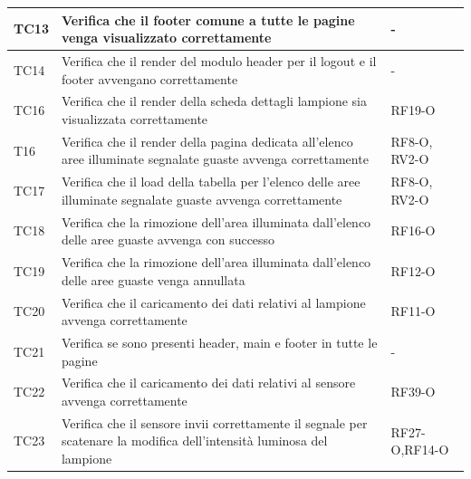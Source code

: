 \documentclass[a4paper, 12pt]{article}
\begin{document}
\begin{center}
	\begin{tabularx}{\textwidth}{|X|X|X|}
	\hline
		\hline
		TC13 & Verifica che il footer comune a tutte le pagine venga visualizzato correttamente & - \\
		\hline
		TC14 & Verifica che il render del modulo header per il logout e il footer avvengano correttamente & - \\
		\hline
		TC16 & Verifica che il render della scheda dettagli lampione sia visualizzata correttamente & RF19-O \\
		\hline
		T16 & Verifica che il render della pagina dedicata all'elenco aree illuminate segnalate guaste avvenga correttamente & RF8-O, RV2-O \\
		\hline
		TC17 & Verifica che il load della tabella per l'elenco delle aree illuminate segnalate guaste avvenga correttamente & RF8-O, RV2-O \\
		\hline
		TC18 & Verifica che la rimozione dell'area illuminata dall'elenco delle aree guaste avvenga con successo & RF16-O \\
		\hline
		TC19 & Verifica che la rimozione dell'area illuminata dall'elenco delle aree guaste venga annullata & RF12-O\\
		\hline
		TC20 & Verifica che il caricamento dei dati relativi al lampione avvenga correttamente & RF11-O \\
		\hline 
		TC21 & Verifica se sono presenti header, main e footer in tutte le pagine & - \\
		\hline
		TC22 & Verifica che il caricamento dei dati relativi al sensore avvenga correttamente & RF39-O \\
		\hline
		TC23 &  Verifica che il sensore invii correttamente il segnale per scatenare la modifica dell'intensità luminosa del lampione & RF27-O,RF14-O\\ 
		\hline
	\end{tabularx}\\[8pt]
	\mbox{}\\
\end{center}
\end{document}
